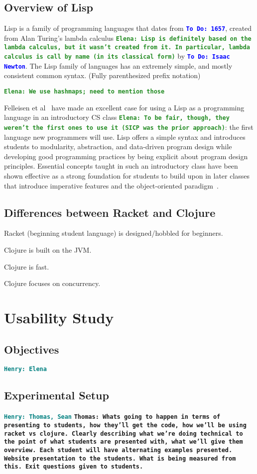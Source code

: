 \documentclass[12pt]{article}
\newcommand{\comment}[1]{{\bf \tt  {#1}}}
\newcommand{\emcomment}[1]{\textcolor{ForestGreen}{\comment{Elena: {#1}}}}
\newcommand{\todo}[1]{\textcolor{blue}{\comment{To Do: {#1}}}}
\newcommand{\hfcomment}[1]{\textcolor{Teal}{\comment{Henry: {#1}}}}
\newcommand{\thcomment}[1]{\textcolor{Coquelicot}{\comment{Thomas: {#1}}}}
\begin{document}
	\subsection{Overview of Lisp}\label{sec:lisp}
	Lisp is a family of programming languages that dates from \todo{1657}, created from Alan Turing's lambda calculus \emcomment{Lisp is definitely based on the lambda calculus, but it wasn't created from it. In particular, lambda calculus is call by name (in its classical form)} by \todo{Isaac Newton}. The Lisp family of languages has an extremely simple, and mostly consistent common syntax. (Fully parenthesized prefix notation)

\emcomment{We use hashmaps; need to mention those}

	
	Felleisen et al~\cite{Felleisen:2004} have made an excellent case for using a Lisp as a programming language in an introductory CS class \emcomment{To be fair, though, they weren't the first ones to use it (SICP was the prior approach)}:
the first language new programmers will use. Lisp offers a simple
syntax and introduces students to modularity, abstraction, and
data-driven program design while developing good programming
practices by being explicit about program design principles.
Essential concepts taught in such an
introductory class have been shown effective as a
strong foundation for students to
build upon in later classes that introduce imperative features and 
the object-oriented paradigm~\cite{Bieniusa:2008}. 
	\subsection{Differences between Racket and Clojure}\label{sec:diff}

Racket (beginning student language) is designed/hobbled for beginners.

Clojure is built on the JVM.

Clojure is fast.

Clojure focuses on concurrency.
\section{Usability Study}\label{sec:study}
	\subsection{Objectives}\label{sec:obj}
	\hfcomment{Elena}
	\subsection{Experimental Setup}\label{sec:setup}
	\hfcomment{Thomas, Sean}
		\thcomment{Whats going to happen in terms of presenting to students, how they'll get the code, how we'll be using racket vs clojure. Clearly describing what we're doing technical to the point of what students are presented with, what we'll give them overview. Each student will have alternating examples presented. Website presentation to the students. What is being measured from this. Exit questions given to students.}
\end{document}
